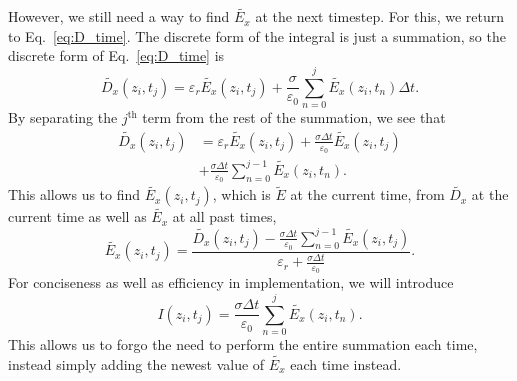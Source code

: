 \documentclass[12pt]{article}
\begin{document}
\begin{multicols}{2}
 However, we still need a way to find $\tilde{E_x}$ at the next timestep. For this, we return to Eq.~\ref{eq:D_time}. The discrete form of the integral is just a summation, so the discrete form of Eq.~\ref{eq:D_time} is
\begin{equation}
\label{eq:first_discrete_D_time}\tilde{D_x}(z_i,t_j)=\varepsilon_r\tilde{E_x}(z_i,t_j)+\frac{\sigma}{\varepsilon_0}\sum_{n=0}^{j}\tilde{E_x}(z_i,t_n)\Delta t.
\end{equation}
By separating the $j^\mathrm{th}$ term from the rest of the summation, we see that
\begin{equation}
\begin{split}
\label{eq:second_discrete_D_time}\tilde{D_x}(z_i,t_j)&=\varepsilon_r\tilde{E_x}(z_i,t_j)+ \frac{\sigma\Delta t}{\varepsilon_0}\tilde{E_x}(z_i,t_j) \\
&+\frac{\sigma\Delta t}{\varepsilon_0}\sum_{n=0}^{j-1}\tilde{E_x}(z_i,t_n).
\end{split}
\end{equation}
This allows us to find $\tilde{E_x}(z_i,t_j)$, which is $\tilde{E}$ at the current time, from $\tilde{D_x}$ at the current time as well as $\tilde{E_x}$ at all past times,
\begin{equation}
\label{eq:first_discrete_E}
\tilde{E_x}(z_i,t_j) = \frac{\tilde{D_x}(z_i,t_j)-\frac{\sigma\Delta t}{\varepsilon_0}\sum_{n=0}^{j-1}\tilde{E_x}(z_i,t_j)}{\varepsilon_r+\frac{\sigma\Delta t}{\varepsilon_0}}.
\end{equation}
For conciseness as well as efficiency in implementation, we will introduce
\begin{equation}
\label{eq:first_I}
I(z_i,t_j) = \frac{\sigma\Delta t}{\varepsilon_0}\sum_{n=0}^{j}\tilde{E_x}(z_i,t_n).
\end{equation}
This allows us to forgo the need to perform the entire summation each time, instead simply adding the newest value of $\tilde{E_x}$ each time instead.


\end{multicols}
\end{document}
